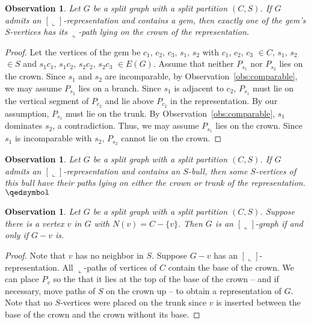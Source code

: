 \documentclass[11pt,3p,times]{elsarticle}
\newenvironment{myproof}{\begin{proof}}{\end{proof}}
\newcommand{\La}{\ensuremath{\llcorner}} \newcommand{\Lb}{\ensuremath{\ulcorner}} \newcommand{\Lc}{\ensuremath{\lrcorner}} \newcommand{\Ld}{\ensuremath{\urcorner}}
\newcommand{\proofBox}{\hfill $\qedsymbol$}
\newtheorem{observation}[theorem]{Observation}
\begin{document}
\begin{observation}\label{obs:gem-on-crown}
Let $G$ be a split graph  with a split partition $(C,S)$.
If $G$ admits an $[\La]$-representation and contains a gem, then
exactly one of the gem's $S$-vertices has its $\La$-path lying
on the crown of the representation.
\end{observation}
\begin{myproof}
Let the vertices of the gem be $c_1$, $c_2$, $c_3$, $s_1$, $s_2$ with $c_1$,
$c_2$, $c_3$ $\in C$, $s_1$, $s_2$ $\in S$ and $s_1 c_1$, $s_1 c_2$, $s_2 c_2$,
$s_2 c_3$ $\in E(G)$. Assume that neither $P_{s_1}$ nor $P_{s_2}$ lies on the
crown. Since $s_1$ and $s_2$ are incomparable, by
Observation~\ref{obs:comparable}, we may assume $P_{s_2}$ lies on
a branch. Since $s_1$ is adjacent to $c_2$, $P_{s_1}$ must lie on
the vertical segment of $P_{c_2}$ and lie above $P_{c_2}$ in the
representation. By our assumption, $P_{s_1}$ must lie on the trunk.
By Observation~\ref{obs:comparable}, $s_1$ dominates $s_2$, a
contradiction. Thus, we may assume $P_{s_1}$ lies on the crown.
Since $s_1$ is incomparable with $s_2$, $P_{s_2}$ cannot lie on the
crown.
\end{myproof}
\begin{observation}\label{obs:bull-on-vertical}
Let $G$ be a split graph  with a split partition $(C,S)$.
If $G$ admits an $[\La]$-representation and contains an $S$-bull,
then some $S$-vertices of this bull have their paths lying on
either the crown or trunk of the representation. \proofBox
\end{observation}
\begin{observation}\label{obs:universal}
Let $G$ be a split graph  with a split partition $(C,S)$.
Suppose there is a vertex $v$ in $G$ with $N(v) = C-\{v\}$. Then
$G$ is an $[\La]$-graph if and only if $G-v$ is. 
\end{observation}
\begin{myproof}
Note that $v$ has no neighbor in $S$.  Suppose $G-v$
has an $[\La]$-representation.  All $\La$-paths of vertices of $C$
contain the base of the crown. We can place $P_v$ so the that it lies at
the top of the base of the crown -- and if necessary, move paths of $S$
on the crown up -- to obtain a representation of $G$. Note that
no $S$-vertices were placed on the trunk since $v$ is inserted 
between the base of the crown and the crown without its base. 
\end{myproof}
\end{document}
